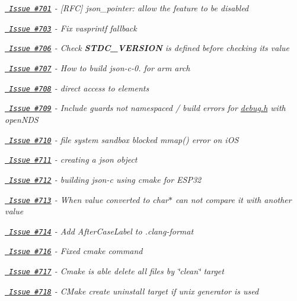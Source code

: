 \begin{DoxyItemize}
\item {\itshape \href{https://github.com/json-c/json-c/issues/701}{\texttt{ Issue \#701}} -\/ \mbox{[}RFC\mbox{]} json\+\_\+pointer\+: allow the feature to be disabled}
\item {\itshape \href{https://github.com/json-c/json-c/issues/703}{\texttt{ Issue \#703}} -\/ Fix vasprintf fallback}
\item {\itshape \href{https://github.com/json-c/json-c/issues/706}{\texttt{ Issue \#706}} -\/ Check {\bfseries{STDC\+\_\+\+VERSION}} is defined before checking its value}
\item {\itshape \href{https://github.com/json-c/json-c/issues/707}{\texttt{ Issue \#707}} -\/ How to build json-\/c-\/0. for arm arch}
\item {\itshape \href{https://github.com/json-c/json-c/issues/708}{\texttt{ Issue \#708}} -\/ direct access to elements}
\item {\itshape \href{https://github.com/json-c/json-c/issues/709}{\texttt{ Issue \#709}} -\/ Include guards not namespaced / build errors for \mbox{\hyperlink{debug_8h}{debug.\+h}} with open\+NDS}
\item {\itshape \href{https://github.com/json-c/json-c/issues/710}{\texttt{ Issue \#710}} -\/ \textquotesingle{}file system sandbox blocked mmap()\textquotesingle{} error on i\+OS}
\item {\itshape \href{https://github.com/json-c/json-c/issues/711}{\texttt{ Issue \#711}} -\/ creating a json object}
\item {\itshape \href{https://github.com/json-c/json-c/issues/712}{\texttt{ Issue \#712}} -\/ building json-\/c using cmake for ESP32}
\item {\itshape \href{https://github.com/json-c/json-c/issues/713}{\texttt{ Issue \#713}} -\/ When value converted to char$\ast$ can not compare it with another value}
\item {\itshape \href{https://github.com/json-c/json-c/issues/714}{\texttt{ Issue \#714}} -\/ Add After\+Case\+Label to .clang-\/format}
\item {\itshape \href{https://github.com/json-c/json-c/issues/716}{\texttt{ Issue \#716}} -\/ Fixed cmake command}
\item {\itshape \href{https://github.com/json-c/json-c/issues/717}{\texttt{ Issue \#717}} -\/ Cmake is able delete all files by \char`\"{}clean\char`\"{} target}
\item {\itshape \href{https://github.com/json-c/json-c/issues/718}{\texttt{ Issue \#718}} -\/ CMake create uninstall target if unix generator is used}

\end{DoxyItemize}
